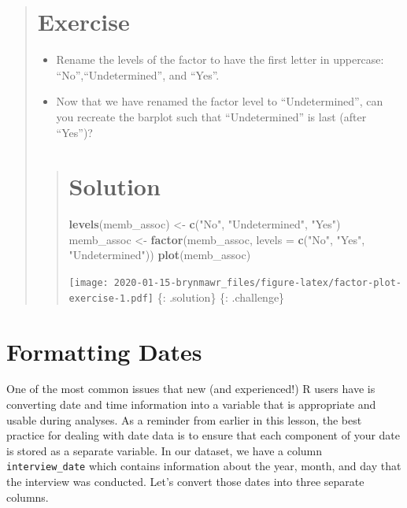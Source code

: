 \documentclass[]{book}
\newenvironment{Shaded}{\begin{snugshade}}{\end{snugshade}}
\newcommand{\KeywordTok}[1]{\textcolor[rgb]{0.13,0.29,0.53}{\textbf{#1}}}
\newcommand{\DataTypeTok}[1]{\textcolor[rgb]{0.13,0.29,0.53}{#1}}
\newcommand{\StringTok}[1]{\textcolor[rgb]{0.31,0.60,0.02}{#1}}
\newcommand{\NormalTok}[1]{#1}
\begin{document}
\begin{quote}
\section{Exercise}\label{exercise-7}

\begin{itemize}
\item
  Rename the levels of the factor to have the first letter in uppercase:
  ``No'',``Undetermined'', and ``Yes''.
\item
  Now that we have renamed the factor level to ``Undetermined'', can you
  recreate the barplot such that ``Undetermined'' is last (after
  ``Yes'')?
\end{itemize}

\begin{quote}
\section{Solution}\label{solution-8}

\begin{Shaded}
\begin{Highlighting}[]
\KeywordTok{levels}\NormalTok{(memb_assoc) <-}\StringTok{ }\KeywordTok{c}\NormalTok{(}\StringTok{"No"}\NormalTok{, }\StringTok{"Undetermined"}\NormalTok{, }\StringTok{"Yes"}\NormalTok{)}
\NormalTok{memb_assoc <-}\StringTok{ }\KeywordTok{factor}\NormalTok{(memb_assoc, }\DataTypeTok{levels =} \KeywordTok{c}\NormalTok{(}\StringTok{"No"}\NormalTok{, }\StringTok{"Yes"}\NormalTok{, }\StringTok{"Undetermined"}\NormalTok{))}
\KeywordTok{plot}\NormalTok{(memb_assoc)}
\end{Highlighting}
\end{Shaded}

\texttt{[image: 2020-01-15-brynmawr\_files/figure-latex/factor-plot-exercise-1.pdf]}
\{: .solution\} \{: .challenge\}
\end{quote}
\end{quote}

\section{Formatting Dates}\label{formatting-dates}

One of the most common issues that new (and experienced!) R users have
is converting date and time information into a variable that is
appropriate and usable during analyses. As a reminder from earlier in
this lesson, the best practice for dealing with date data is to ensure
that each component of your date is stored as a separate variable. In
our dataset, we have a column \texttt{interview\_date} which contains
information about the year, month, and day that the interview was
conducted. Let's convert those dates into three separate columns.
\end{document}

